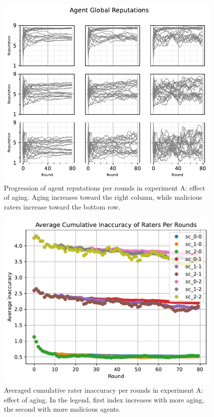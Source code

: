 \documentclass[%
    ]{\PathToTumTemplate/thesis/tum_thesis}
\begin{document}
\begin{figure}[tbp]
  \begin{center}
        \includegraphics[width=0.75\linewidth]	{../results/a/ReputationsPerRounds_joined.pdf}
    \caption{
 	Progression of agent reputations per rounds in experiment A: effect of aging.
    Aging increases toward the right column, while malicious raters increase toward the bottom row.
    }
    \label{fig:res_a_reps}
  \end{center}
\end{figure}

\begin{figure}[tbp]
  \begin{center}
        \includegraphics[width=0.75\linewidth]	{../results/a/AvgAccuracyPerRound.pdf}
    \caption{
    Averaged cumulative rater inaccuracy per rounds in experiment A: effect of aging.
    In the legend, first index increases with more aging, the second with more malicious agents.
    }
    \label{fig:res_a_rateinaccuracy}
  \end{center}
\end{figure}
\end{document}
